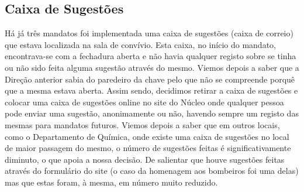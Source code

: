 
\subsection{Caixa de Sugestões}

Há já três mandatos foi implementada uma caixa de sugestões (caixa de correio) que estava localizada na sala de convívio. Esta caixa, no início do mandato, encontrava-se com a fechadura aberta e não havia qualquer registo sobre se tinha ou não sido feita alguma sugestão através do mesmo. Viemos depois a saber que a Direção anterior sabia do paredeiro da chave pelo que não se compreende porquê que a mesma estava aberta. Assim sendo, decidimos retirar a caixa de sugestões e colocar uma caixa de sugestões online no site do Núcleo onde qualquer pessoa pode enviar uma sugestão, anonimamente ou não, havendo sempre um registo das mesmas para mandatos futuros. Viemos depois a saber que em outros locais, como o Departamento de Química, onde existe uma caixa de sugestões no local de maior passagem do mesmo, o número de sugestões feitas é significativamente diminuto, o que apoia a nossa decisão. De salientar que houve sugestões feitas através do formulário do site (o caso da homenagem aos bombeiros foi uma delas) mas que estas foram, à mesma, em número muito reduzido.